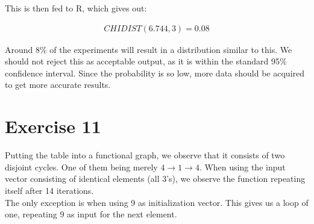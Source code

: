 \documentclass[10pt,a4paper]{article}
\begin{document}
This is then fed to R, which gives out:

\begin{eqnarray}
CHIDIST \left(6.744,3\right) = 0.08
\end{eqnarray}

Around 8\% of the experiments will result in a distribution similar to this. We should not reject this as acceptable output, as it is within the standard 95\% confidence interval. Since the probability is so low, more data should be acquired to get more accurate results.

\section*{Exercise 11}
Putting the table into a functional graph, we observe that it consists of two disjoint cycles. One of them being merely $4 \rightarrow 1 \rightarrow 4$.
When using the input vector consisting of identical elements (all 3's), we observe the function repeating itself after 14 iterations.\\
The only exception is when using 9 as initialization vector. This gives us a loop of one, repeating 9 as input for the next element.
\end{document}

